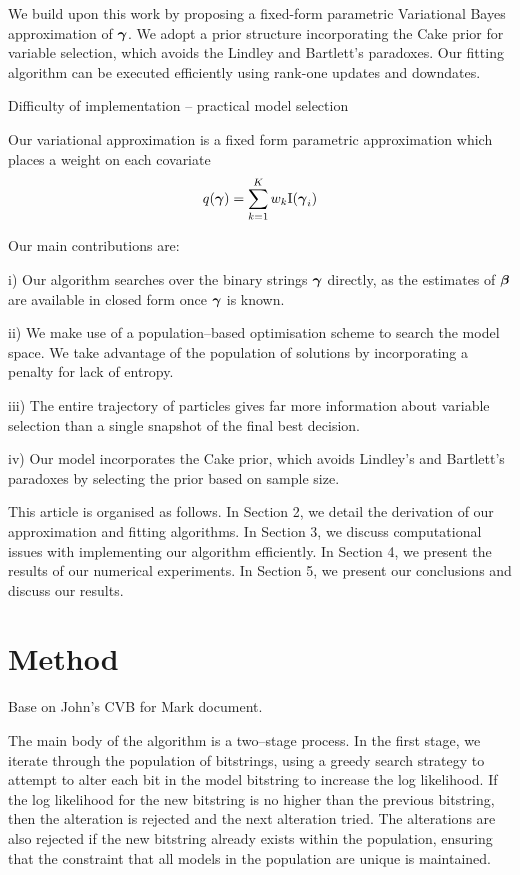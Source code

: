 \documentclass{amsart}[12pt]
\begin{document}
We build upon this work by proposing a fixed-form parametric Variational Bayes approximation of ${\boldsymbol \gamma}$.
We adopt a prior structure incorporating the Cake prior for variable selection, which avoids the Lindley
and Bartlett's paradoxes.
Our fitting algorithm can be executed efficiently using rank-one updates and downdates.

Difficulty of implementation -- practical model selection
\cite{Chipman2014}

Our variational approximation is a fixed form parametric approximation which places a weight on each covariate
\[
	q({\boldsymbol \gamma}) = \sum_{k=1}^K w_k \text{I}({\boldsymbol \gamma}_i)
\]


Our main contributions are:

i) Our algorithm searches over the binary strings ${\boldsymbol \gamma}$ directly, as the estimates of ${\boldsymbol \beta}$ are available 
in closed form once ${\boldsymbol \gamma}$ is known.

ii) We make use of a population--based optimisation scheme to search the model space. We take advantage of the
population of solutions by incorporating a penalty for lack of entropy.

iii) The entire trajectory of particles gives far more information about variable selection than a single
snapshot of the final best decision.

iv) Our model incorporates the Cake prior, which avoids Lindley's and Bartlett's paradoxes by selecting the
prior based on sample size.

This article is organised as follows. In Section 2, we detail the derivation of our approximation and fitting
algorithms. In Section 3, we discuss computational issues with implementing our algorithm efficiently. In
Section 4, we present the results of our numerical experiments. In Section 5, we present our conclusions and
discuss our results.

\section{Method}

Base on John's CVB for Mark document.

The main body of the algorithm is a two--stage process. In the first stage, we iterate through the population of
bitstrings, using a greedy search strategy to attempt to alter each bit in the model bitstring to increase the log likelihood. If the log likelihood for the new bitstring is no higher than the previous bitstring, then the
alteration is rejected and the next alteration tried. The alterations are also rejected if the new bitstring
already exists within the population, ensuring that the constraint that all models in the population are
unique is maintained.
\end{document}
